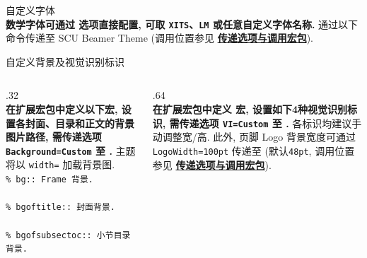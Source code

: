 \begin{frame}{自定义字体 }
  \\[.5ex]
  \textbf{数学字体可通过  选项直接配置, 可取 \texttt{XITS}、\texttt{LM} 或任意自定义字体名称.} 通过以下命令传递至 SCU Beamer Theme (调用位置参见 \hyperref[frame:PassOpts]{\textbf{传递选项与调用宏包}}).\\
\end{frame}

\begin{frame}{自定义背景及视觉识别标识 }\label{goto:CustomBackgroundTheme}
  \begin{columns}[T, onlytextwidth]
    \begin{column}{.32\textwidth}
      \\[.5ex]
      \textbf{在扩展宏包中定义以下宏, 设置各封面、目录和正文的背景图片路径, 需传递选项 \texttt{Background=Custom} 至 .} 主题将以 \texttt{width=} 加载背景图.\\[1ex]

      \texttt{\% bg:: Frame 背景.}\\
      \\[.5ex]
      \texttt{\% bgoftitle:: 封面背景.}\\
      \\[.5ex]
      \texttt{\% bgofsubsectoc:: 小节目录背景.}\\
    \end{column}\hfil
    \begin{column}{.64\textwidth}
      \\[.5ex]
      \textbf{在扩展宏包中定义  宏, 设置如下4种视觉识别标识, 需传递选项 \texttt{VI=Custom} 至 .} 各标识均建议手动调整宽/高. 此外, 页脚 Logo 背景宽度可通过 \texttt{LogoWidth=100pt} 传递至 (默认\texttt{48pt}, 调用位置参见 \hyperref[frame:PassOpts]{\textbf{传递选项与调用宏包}}).\\[1ex]


\end{column}
\end{columns}
\end{frame}
